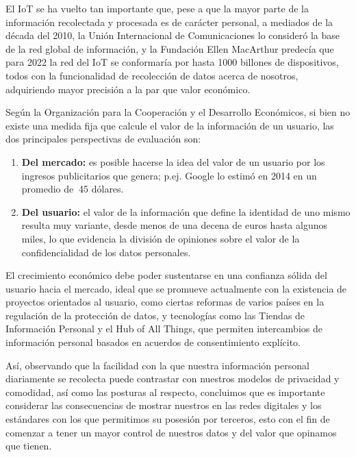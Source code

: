 El IoT se ha vuelto tan importante que, pese a que la mayor parte de la información recolectada y procesada es de carácter personal, a mediados de la década del 2010, la Unión Internacional de Comunicaciones lo consideró la base de la red global de información, y la Fundación Ellen MacArthur predecía que para 2022 la red del IoT se conformaría por hasta 1000 billones de dispositivos, todos con la funcionalidad de recolección de datos acerca de nosotros, adquiriendo mayor precisión a la par que valor económico.

Según la Organización para la Cooperación y el Desarrollo Económicos, si bien no existe una medida fija que calcule el valor de la información de un usuario, las dos principales perspectivas de evaluación son:
\begin{enumerate}
    \item \textbf{Del mercado:} es posible hacerse la idea del valor de un usuario por los ingresos publicitarios que genera; p.ej. Google lo estimó en 2014 en un promedio de $~$45 dólares.
    \item \textbf{Del usuario:} el valor de la información que define la identidad de uno mismo resulta muy variante, desde menos de una decena de euros hasta algunos miles, lo que evidencia la división de opiniones sobre el valor de la confidencialidad de los datos personales. 
\end{enumerate}

El crecimiento económico debe poder sustentarse en una confianza sólida del usuario hacia el mercado, ideal que se promueve actualmente con la existencia de proyectos orientados al usuario, como ciertas reformas de varios países en la regulación de la protección de datos, y tecnologías como las Tiendas de Información Personal y el Hub of All Things, que permiten intercambios de información personal basados en acuerdos de consentimiento explícito.

Así, observando que la facilidad con la que nuestra información personal diariamente se recolecta puede contrastar con nuestros modelos de privacidad y comodidad, así como las posturas al respecto, concluimos que es importante considerar las consecuencias de mostrar nuestros en las redes digitales y los estándares con los que permitimos su posesión por terceros, esto con el fin de comenzar a tener un mayor control de nuestros datos y del valor que opinamos que tienen.
